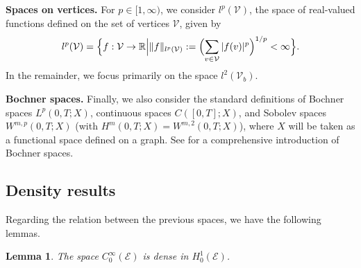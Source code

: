 \documentclass[a4paper, 10pt, english]{article}
\def\to{\rightarrow}
\newtheorem{lemma}{Lemma}[section]
\begin{document}
\smallbreak

\noindent
\textbf{Spaces on vertices.} For $p\in[1,\infty)$, we consider $l^p(\mathcal{V})$, the space of real-valued functions defined on the set of vertices $\mathcal{V}$, given by
\begin{align*}
l^p(\mathcal{V})
=
\Bigl\{
  f:\mathcal{V} \to \mathbb{R}
  \Big|
  \|f\|_{l^p(\mathcal{V})}
  :=
  \Bigl(\sum_{v \in \mathcal{V}} |f(v)|^p\Bigr)^{1/p}
  < \infty
\Bigr\}.
\end{align*}
In the remainder, we focus primarily on the space $l^2(\mathcal{V}_b)$.
\smallbreak

\noindent
{\bf Bochner spaces.} Finally, we also consider the standard definitions of Bochner spaces $L^p(0,T;X)$, continuous spaces $C([0,T];X)$, and Sobolev spaces $W^{m,p}(0,T;X)$ (with $H^m(0,T;X)=W^{m,2}(0,T;X)$), where $X$ will be taken as a functional space defined on a graph. See \cite[Section 5.9.2]{evans_book} for a comprehensive introduction of Bochner spaces.



\subsection{Density results}
Regarding the relation between the previous spaces, we have the following lemmas.

    \begin{lemma}\label{lemma:dense_CinfH1}
The space $C^\infty_0(\mathcal{E})$ is dense in $H_0^1(\mathcal{E})$.
\end{lemma}
\end{document}
